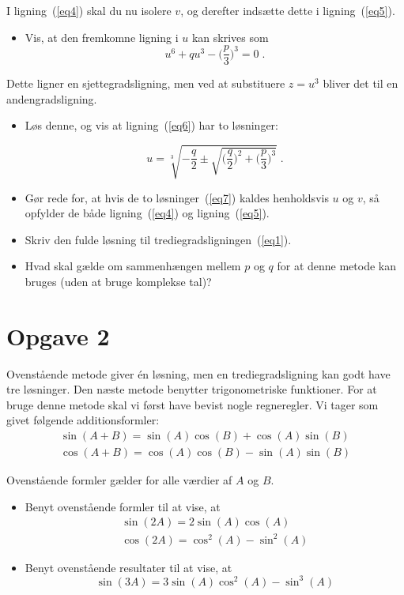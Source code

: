 \documentclass[12pt,oneside,a4paper]{article}
\begin{document}
        I ligning~(\ref{eq4}) skal du nu isolere $v$, og derefter indsætte dette
        i ligning~(\ref{eq5}).
\begin{itemize}
    \item Vis, at den fremkomne ligning i $u$ kan skrives som
        \begin{equation}
            u^6 + qu^3-\Big(\frac{p}{3}\Big)^3 = 0 \;.
            \label{eq6}
        \end{equation}
\end{itemize}

Dette ligner en sjettegradsligning, men ved at substituere $z=u^3$ bliver
det til en andengradsligning.


\begin{itemize}
    \item Løs denne, og vis at ligning~(\ref{eq6}) har to løsninger:

        \begin{equation}
            u =
            \sqrt[3]{-\frac{q}{2}\pm\sqrt{\Big(\frac{q}{2}\Big)^2+\Big(\frac{p}{3}\Big)^3}} \;.
            \label{eq7}
        \end{equation}
    \item Gør rede for, at hvis de to løsninger~(\ref{eq7}) kaldes henholdsvis $u$ og $v$, så opfylder de både ligning~(\ref{eq4}) og ligning~(\ref{eq5}).
    \item Skriv den fulde løsning til trediegradsligningen~(\ref{eq1}).
    \item Hvad skal gælde om sammenhængen mellem $p$ og $q$ for at denne metode
        kan bruges (uden at bruge komplekse tal)?
\end{itemize}

\section*{Opgave 2}
Ovenstående metode giver én løsning, men en trediegradsligning kan godt have
tre løsninger. Den næste metode benytter trigonometriske funktioner. For at
bruge denne metode skal vi først have bevist nogle regneregler. Vi tager som
givet følgende additionsformler:
\begin{eqnarray}
    \sin(A+B) = \sin(A)\cos(B) + \cos(A)\sin(B) \\
    \cos(A+B) = \cos(A)\cos(B) - \sin(A)\sin(B)
\end{eqnarray}

Ovenstående formler gælder for alle værdier af $A$ og $B$.
\begin{itemize}
    \item Benyt ovenstående formler til at vise, at 
        \begin{eqnarray}
            \sin(2A) = 2\sin(A)\cos(A) \\
            \cos(2A) = \cos^2(A) - \sin^2(A)
        \end{eqnarray}
    \item Benyt ovenstående resultater til at vise, at
        \begin{equation}
            \sin(3A) = 3\sin(A)\cos^2(A) - \sin^3(A)
            \label{eq12}
        \end{equation}
\end{itemize}
\end{document}
